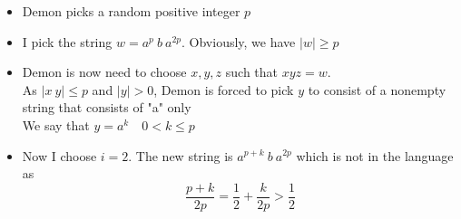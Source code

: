 \documentclass [9 pt]{article}
\theoremstyle{definition}
\begin{document}
\begin{itemize}
	\item Demon picks a random positive integer $p$\\
	\item I pick the string $w = a^{p}\ b\ a^{2p}$. Obviously, we have $|w| \geq p$ \\
	\item Demon is now need to choose $x, y, z$ such that $xyz = w$.\\ As $|x\ y| \leq p$ and $|y| > 0$, Demon is forced to pick $y$ to consist of a nonempty string that consists of "a" only\\
	We say that $y = a^{k}\quad 0 < k \leq p$\\
	\item Now I choose $i = 2$. The new string is $a^{p+k}\ b\ a^{2p}$ which is not in the language as 
	 $$ \dfrac{p + k}{2p} = \dfrac{1}{2} + \dfrac{k}{2p} > \dfrac{1}{2} $$
\end{itemize}






















\newpage
\end{document}
